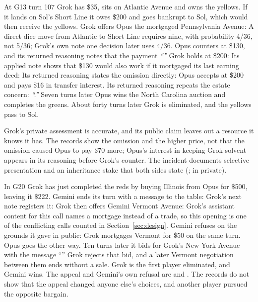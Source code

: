 At G13 turn 107 Grok has \$35, sits on Atlantic Avenue and owns the yellows. If it lands on Sol's Short Line it owes \$200 and goes bankrupt to Sol, which would then receive the yellows. Grok offers Opus the mortgaged Pennsylvania Avenue:
A direct dice move from Atlantic to Short Line requires nine, with probability 4/36, not 5/36; Grok's own note one decision later uses 4/36. Opus counters at \$130, and its returned reasoning notes that the payment \emph{``''} Grok holds at \$200:
Its applied note shows that \$130 would also work if it mortgaged its last earning deed:
Its returned reasoning states the omission directly:
Opus accepts at \$200 and pays \$16 in transfer interest. Its returned reasoning repeats the estate concern: \emph{``.''} Seven turns later Opus wins the North Carolina auction and completes the greens. About forty turns later Grok is eliminated, and the yellows pass to Sol.

Grok's private assessment is accurate, and its public claim leaves out a resource it knows it has. The records show the omission and the higher price, not that the omission caused Opus to pay \$70 more; Opus's interest in keeping Grok solvent appears in its reasoning before Grok's counter. The incident documents selective presentation and an inheritance stake that both sides state (;  in private).

In G20 Grok has just completed the reds by buying Illinois from Opus for \$500, leaving it \$222. Gemini ends its turn with a message to the table:
Grok's next note registers it:
Grok then offers Gemini Vermont Avenue:
Grok's assistant content for this call names a mortgage instead of a trade, so this opening is one of the conflicting calls counted in Section~\ref{sec:design}. Gemini refuses on the grounds it gave in public:
Grok mortgages Vermont for \$50 on the same turn. Opus goes the other way. Ten turns later it bids for Grok's New York Avenue with the message ``'' Grok rejects that bid, and a later Vermont negotiation between them ends without a sale. Grok is the first player eliminated, and Gemini wins. The appeal and Gemini's own refusal are  and . The records do not show that the appeal changed anyone else's choices, and another player pursued the opposite bargain.

